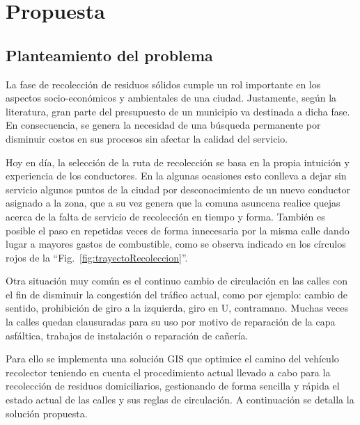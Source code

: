 \chapter{Propuesta}
\label{chap5}
\ifpdf
  \graphicspath{{Chapter5/Chapter5Figs/PNG/}{Chapter5/Chapter5Figs/PDF/}{Chapter5/Chapter5Figs/}}
\else
  \graphicspath{{Chapter5/Chapter5Figs/EPS/}{Chapter5/Chapter5Figs/}}
\fi


\section{Planteamiento del problema}
\label{sec:planteamiento}

La fase de recolección de residuos sólidos cumple un rol importante en los aspectos socio-económicos y ambientales de una ciudad. Justamente, según la literatura, gran parte del presupuesto de un municipio va destinada a dicha fase. En consecuencia, se genera la necesidad de una búsqueda permanente por disminuir costos en sus procesos sin afectar la calidad del servicio. 

Hoy en día, la selección de la ruta de recolección se basa en la propia intuición y experiencia de los conductores. En la algunas ocasiones esto conlleva a dejar sin servicio algunos puntos de la ciudad por desconocimiento de un nuevo conductor asignado a la zona, que a su vez genera que la comuna asuncena realice quejas acerca de la falta de servicio de recolección en tiempo y forma. También es posible el paso en repetidas veces de forma innecesaria por la misma calle dando lugar a mayores gastos de combustible, como se observa indicado en los círculos rojos de la ``Fig.~\ref{fig:trayectoRecoleccion}''.

Otra situación muy común es el continuo cambio de circulación en las calles con el fin de disminuir la congestión del tráfico actual, como por ejemplo: cambio de sentido, prohibición de giro a la izquierda, giro en U, contramano. Muchas veces la calles quedan clausuradas para su uso por motivo de reparación de la capa asfáltica, trabajos de instalación o reparación de cañería. 

Para ello se implementa una solución GIS que optimice el camino del vehículo recolector teniendo en cuenta el procedimiento actual llevado a cabo para la recolección de residuos domiciliarios, gestionando de forma sencilla y rápida el estado actual de las calles y sus reglas de circulación. A continuación se detalla la solución propuesta.

